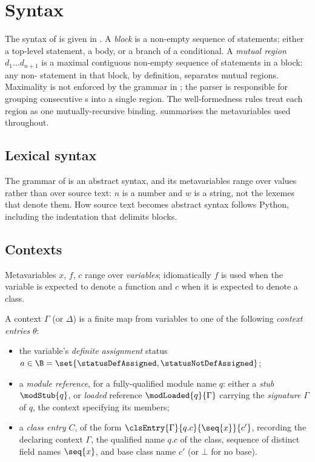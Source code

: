 \section{Syntax}
\label{sec:syntax}

The syntax of \PurePy is given in . A \emph{block} is a non-empty sequence of
statements; either a top-level statement, a  body, or a branch of a conditional. A
\emph{mutual region} $d_1 \ldots d_{n+1}$ is a maximal contiguous non-empty sequence of 
statements in a block: any non- statement in that block, by definition, separates mutual
regions. Maximality is not enforced by the grammar in ; the parser is responsible for
grouping consecutive s into a single region. The well-formedness rules treat each region as
one mutually-recursive binding.
 summarises the metavariables used throughout.



\subsection{Lexical syntax}
\label{sec:lexical}

The grammar of \PurePy is an abstract syntax, and its metavariables range over values rather than
over source text: $n$ is a number and $w$ is a string, not the lexemes that denote them. How source text
becomes abstract syntax follows Python, including the indentation that delimits blocks.

\subsection{Contexts}
\label{sec:contexts}

Metavariables $x$, $f$, $c$ range over \emph{variables}; idiomatically $f$ is used when the variable is expected to denote a function and $c$ when it is expected to denote a class.

\begin{definition}[Context]
\label{def:context}
A context $\Gamma$ (or $\Delta$) is a finite map from variables to one of the following \emph{context entries} $\theta$:
\begin{itemize}
\item the variable's \emph{definite assignment} status $a \in \B = \set{\statusDefAssigned, \statusNotDefAssigned}$;
\item a \emph{module reference}, for a fully-qualified module name $q$: either a \emph{stub} $\modStub{q}$, or \emph{loaded} reference $\modLoaded{q}{\Gamma}$ carrying the \emph{signature} $\Gamma$ of $q$, the context specifying its members;
\item a \emph{class entry} $C$, of the form $\clsEntry{\Gamma}{q.c}{\seq{x}}{c'}$, recording the declaring context $\Gamma$, the qualified name $q.c$ of the class, sequence of distinct field names $\seq{x}$, and base class name $c'$ (or $\bot$ for no base).
\end{itemize}
\end{definition}


